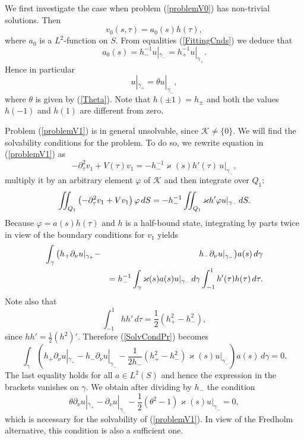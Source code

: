 \documentclass[graybox]{svmult}
\renewcommand{\kappa}{\varkappa}
\renewcommand{\phi}{\varphi}
\newcommand{\eqref}[1]{(\ref{#1})}
\newcommand{\pte}{\partial_\tau}
\begin{document}
We first investigate the case when problem \eqref{problemV0} has non-trivial solutions. Then
$$
v_0(s,\tau)=a_0(s)h(\tau),
$$
where $a_0$ is a $L^2$-function on $S$. From equalities \eqref{FittingCnds} we deduce that
$$
   a_0(s)=h_-^{-1}u|_{\gamma_-}=h_+^{-1}u|_{\gamma_+}.
$$
Hence in particular
\begin{equation}\label{RCond0}
     u|_{\gamma_+}=\theta u|_{\gamma_-},
\end{equation}
where $\theta$ is given by \eqref{Theta}. Note that $h(\pm 1)=h_\pm$ and both the values $h(-1)$ and $h(1)$ are different from zero.

Problem \eqref{problemV1} is in general unsolvable, since $\mathcal{K}\neq\{0\}$. We will find the solvabi\-li\-ty conditions for the problem. To do so, we rewrite  equation in \eqref{problemV1} as
$$
  -\pte^2 v_1+V(\tau)v_1=- h_-^{-1}\kappa(s)h'(\tau)\,u|_{\gamma_-},
$$
multiply it by an arbitrary element $\phi$ of  $\mathcal{K}$  and then integrate over $Q_1$:
$$
\int\kern-6pt\int_{Q_1}\left(-\pte^2 v_1+Vv_1\right)\phi\,dS=
-h_-^{-1}\int\kern-6pt\int_{Q_1}\kappa h' \phi u|_{\gamma_-}\,dS.
$$
Because $\phi=a(s)h(\tau)$ and $h$ is a half-bound state, integrating by parts twice  in view of the boundary conditions for $v_1$ yields
\begin{eqnarray}\nonumber
\int_{\gamma}\big(h_+\partial_\nu u|_{\gamma_+}-&&\kern-4pt h_-\partial_\nu u|_{\gamma_-}\big) a(s)\,d\gamma\\\label{SolvCondPr}
&&=h_-^{-1} \int_{\gamma}\kappa(s)a(s)u|_{\gamma_-}\,d\gamma
\int_{-1}^1h'(\tau)h(\tau)\,d \tau.
\end{eqnarray}
Note also that
$$
  \int_{-1}^1hh'\,d \tau=\frac12 \left(h_+^2-h_-^2\right),
$$
since $hh'=\frac12 (h^2)'$. Therefore \eqref{SolvCondPr} becomes
$$
\int_{\gamma}\left(h_+\partial_\nu u|_{\gamma_+}-h_-\partial_\nu u|_{\gamma_-}
-\frac{1}{2 h_-}(h_+^2-h_-^2)\kappa(s)u|_{\gamma_-}\right)a(s)\,d\gamma= 0.
$$
The last equality holds for all $a\in L^2(S)$ and hence  the expression in the brackets vanishes on $\gamma$. We obtain after dividing by $h_-$ the  condition
\begin{equation}\label{RCond1}
  \theta\partial_\nu u|_{\gamma_+}-\partial_\nu u|_{\gamma_-}
-\textstyle\frac{1}{2 }(\theta^2-1) \kappa(s) u|_{\gamma_-}=0,
\end{equation}
which is necessary for the solvability of \eqref{problemV1}.
In view of the Fredholm alternative, this condition is also a sufficient one.
\end{document}

